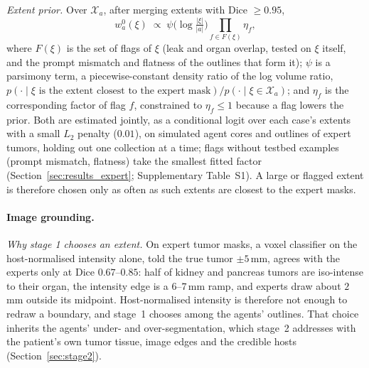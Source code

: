 \documentclass[fleqn,10pt]{olplainarticle}
\begin{document}
\emph{Extent prior.} Over $\mathcal{X}_a$, after merging extents with Dice $\ge0.95$,
\begin{equation}
\label{eq:extent_prior}
w^0_a(\xi)\;\propto\;\psi\bigl(\log\tfrac{|\xi|}{|a|}\bigr)\prod_{f\in F(\xi)}\eta_f,
\end{equation}
where $F(\xi)$ is the set of flags of $\xi$ (leak and organ overlap, tested on $\xi$ itself, and the prompt mismatch and
flatness of the outlines that form it); $\psi$ is a parsimony term, a piecewise-constant density ratio of the log volume
ratio, $p(\cdot\mid\xi\text{ is the extent closest to the expert mask})/p(\cdot\mid\xi\in\mathcal{X}_a)$; and $\eta_f$ is
the corresponding factor of flag $f$, constrained to $\eta_f\le1$ because a flag lowers the prior. Both are estimated
jointly, as a conditional logit over each case's extents with a small $L_2$ penalty ($0.01$), on simulated agent cores
and outlines of expert tumors, holding out one collection at a time; flags without testbed examples (prompt mismatch,
flatness) take the smallest fitted factor (Section~\ref{sec:results_expert}; Supplementary Table~S1). A large or
flagged extent is therefore chosen only as often as such extents are closest to the expert masks.

\paragraph{Image grounding.}
\label{sec:grounding_details}
\emph{Why stage 1 chooses an extent.} On expert tumor masks, a voxel classifier on the host-normalised intensity alone, told
the true tumor $\pm5$\,mm, agrees with the experts only at Dice $0.67$--$0.85$: half of kidney and pancreas tumors are
iso-intense to their organ, the intensity edge is a $6$--$7$\,mm ramp, and experts draw about $2$\,mm outside its midpoint.
Host-normalised intensity is therefore not enough to redraw a boundary, and stage~1 chooses among the agents' outlines.
That choice inherits the agents' under- and over-segmentation, which stage~2 addresses with the patient's own tumor tissue,
image edges and the credible hosts (Section~\ref{sec:stage2}).
\end{document}

